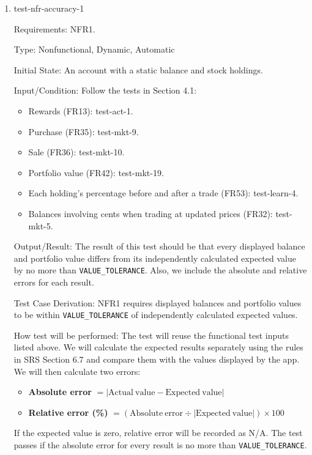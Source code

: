 \documentclass[12pt, titlepage]{article}
\begin{document}
\begin{enumerate}

\item{test-nfr-accuracy-1\\}

Requirements: NFR1.

Type: Nonfunctional, Dynamic, Automatic
					
Initial State:  An account with a static balance and stock holdings.
					
Input/Condition: Follow the tests in Section 4.1:

\begin{itemize}
    \item Rewards (FR13): test-act-1.
    \item Purchase (FR35): test-mkt-9.
    \item Sale (FR36): test-mkt-10.
    \item Portfolio value (FR42): test-mkt-19.
    \item Each holding's percentage before and after a trade (FR53):
    test-learn-4.
    \item Balances involving cents when trading at updated prices (FR32):
    test-mkt-5.
\end{itemize}

Output/Result: The result of this test should be that every displayed balance and portfolio value differs from its independently calculated expected value by no more than  \texttt{VALUE\_TOLERANCE}. Also, we include the absolute and relative errors for each result.					

Test Case Derivation: NFR1 requires displayed balances and portfolio
values to be within \texttt{VALUE\_TOLERANCE}  of independently
calculated expected values.

How test will be performed: The test will reuse the functional test inputs listed above. We will calculate
the expected results separately using the rules in SRS Section 6.7 and compare
them with the values displayed by the app. We will then calculate two errors:

\begin{itemize}
    \item \textbf{Absolute error}
    \(= |\mathrm{Actual\ value} - \mathrm{Expected\ value}|\)

    \item \textbf{Relative error (\%)}
    \(= (\mathrm{Absolute\ error} \div |\mathrm{Expected\ value}|) \times 100\)
\end{itemize}

If the expected value is zero, relative error will be recorded as N/A.
The test passes if the absolute error for every result is no more than  \texttt{VALUE\_TOLERANCE}.
					


\end{enumerate}
\end{document}
